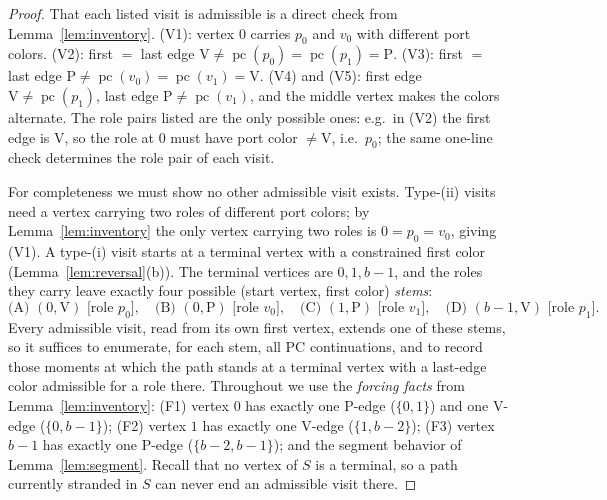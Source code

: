 \documentclass[11pt]{article}
\theoremstyle{definition}
\DeclareMathOperator{\pc}{pc}
\begin{document}
\begin{proof}
That each listed visit is admissible is a direct check from
Lemma~\ref{lem:inventory}. (V1): vertex $0$ carries $p_0$ and $v_0$ with different
port colors. (V2): first $=$ last edge $\mathrm V \ne \pc(p_0) = \pc(p_1) =
\mathrm P$. (V3): first $=$ last edge $\mathrm P \ne \pc(v_0) = \pc(v_1) =
\mathrm V$. (V4) and (V5): first edge $\mathrm V \ne \pc(p_1)$, last edge
$\mathrm P \ne \pc(v_1)$, and the middle vertex makes the colors alternate. The role
pairs listed are the only possible ones: e.g.\ in (V2) the first edge is
$\mathrm V$, so the role at $0$ must have port color $\ne \mathrm V$, i.e.\ $p_0$;
the same one-line check determines the role pair of each visit.

For completeness we must show no other admissible visit exists. Type-(ii) visits
need a vertex carrying two roles of different port colors; by
Lemma~\ref{lem:inventory} the only vertex carrying two roles is $0 = p_0 = v_0$,
giving (V1). A type-(i) visit starts at a terminal vertex with a constrained first
color (Lemma~\ref{lem:reversal}(b)). The terminal vertices are $0, 1, b-1$, and the
roles they carry leave exactly four possible (start vertex, first color)
\emph{stems}:
\[
\text{(A) } (0, \mathrm V) \text{ [role } p_0\text{]}, \quad
\text{(B) } (0, \mathrm P) \text{ [role } v_0\text{]}, \quad
\text{(C) } (1, \mathrm P) \text{ [role } v_1\text{]}, \quad
\text{(D) } (b-1, \mathrm V) \text{ [role } p_1\text{]}.
\]
Every admissible visit, read from its own first vertex, extends one of these stems,
so it suffices to enumerate, for each stem, all PC continuations, and to record those
moments at which the path stands at a terminal vertex with a last-edge color
admissible for a role there. Throughout we use the \emph{forcing facts} from
Lemma~\ref{lem:inventory}:
(F1) vertex $0$ has exactly one P-edge ($\{0,1\}$) and one V-edge ($\{0,b-1\}$);
(F2) vertex $1$ has exactly one V-edge ($\{1,b-2\}$);
(F3) vertex $b-1$ has exactly one P-edge ($\{b-2,b-1\}$);
and the segment behavior of Lemma~\ref{lem:segment}. Recall that no vertex of $S$ is
a terminal, so a path currently stranded in $S$ can never end an admissible visit
there.


\end{proof}
\end{document}

